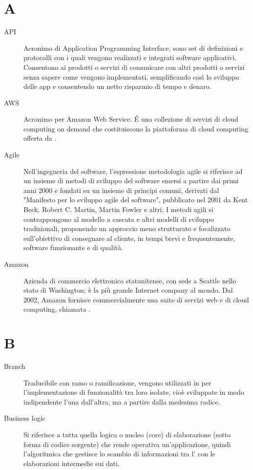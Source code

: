 \documentclass[a4paper, oneside]{article}
\begin{document}
\copertina{}


\newpage
\newpage
\tableofcontents

\newpage

\section{A}
\begin{description}
  \item[API] Acronimo di Application Programming Interface, sono set di definizioni e protocolli con i quali vengono realizzati e integrati software applicativi. Consentono ai prodotti o servizi di comunicare con altri prodotti o servizi senza sapere come vengono implementati, semplificando così lo sviluppo delle app e consentendo un netto risparmio di tempo e denaro.
  \item[AWS] Acronimo per Amazon Web Service. É una collezione di servizi di cloud computing on demand che costituiscono la piattaforma di cloud computing offerta da .
  \item[Agile] Nell'ingegneria del software, l'espressione metodologia agile si riferisce ad un insieme di metodi di sviluppo del software emersi a partire dai primi anni 2000 e fondati su un insieme di principi comuni, derivati dal "Manifesto per lo sviluppo agile del software", pubblicato nel 2001 da Kent Beck, Robert C. Martin, Martin Fowler e altri. I metodi agili si contrappongono al modello a cascata e altri modelli di sviluppo tradizionali, proponendo un approccio meno strutturato e focalizzato sull'obiettivo di consegnare al cliente, in tempi brevi e frequentemente, software funzionante e di qualità.
  \item[Amazon] Azienda di commercio elettronico statunitense, con sede a Seattle nello stato di Washington; è la più grande Internet company al mondo. Dal 2002, Amazon fornisce commercialmente una suite di servizi web e di cloud computing, chiamata .
\end{description}
\newpage
\section{B}
\begin{description}
  \item[Branch] Traducibile con ramo o ramificazione, vengono utilizzati in  per l'implementazione di funzionalità tra loro isolate, cioè sviluppate in modo indipendente l'una dall'altra, ma a partire dalla medesima radice.
  \item[Business logic] Si riferisce a tutta quella logica o nucleo (core) di elaborazione (sotto forma di codice sorgente) che rende operativa un'applicazione, quindi l'algoritmica che gestisce lo scambio di informazioni tra l' con le elaborazioni intermedie sui dati.
\end{description}
\newpage
\end{document}
